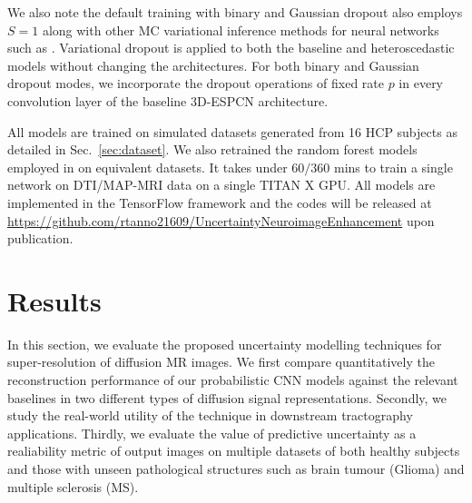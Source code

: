 We also note the default training with binary and Gaussian dropout also employs $S=1$ \cite {srivastava2014dropout} along with other MC variational inference methods for neural networks such as \cite{kingma2013auto,kingma2015variational,gal2017concrete}. Variational dropout is applied to both the baseline and heteroscedastic models without changing the architectures. For both binary and Gaussian dropout modes, we incorporate the dropout operations of fixed rate $p$ in every convolution layer of the baseline 3D-ESPCN architecture. 

All models are trained on simulated datasets generated from 16 HCP subjects as detailed in Sec.~\ref{sec:dataset}. We also retrained the random forest models employed in \cite{tanno2016bayesian,alexander2017image} on equivalent datasets. It takes under $60/360$ mins to train a single network on DTI/MAP-MRI data on a single TITAN X GPU. All models are implemented in the TensorFlow framework \cite{abadi2016tensorflow} and the codes will be released at \url{https://github.com/rtanno21609/UncertaintyNeuroimageEnhancement} upon publication. 


\section{Results}
In this section, we evaluate the proposed uncertainty modelling techniques for super-resolution of diffusion MR images. We first compare quantitatively the reconstruction performance of our probabilistic CNN models against the relevant baselines in two different types of diffusion signal representations. Secondly, we study the real-world utility of the technique in downstream tractography applications. Thirdly, we evaluate the value of predictive uncertainty as a realiability metric of output images on multiple datasets of both healthy subjects and those with unseen pathological structures such as brain tumour (Glioma) and multiple sclerosis (MS). 



